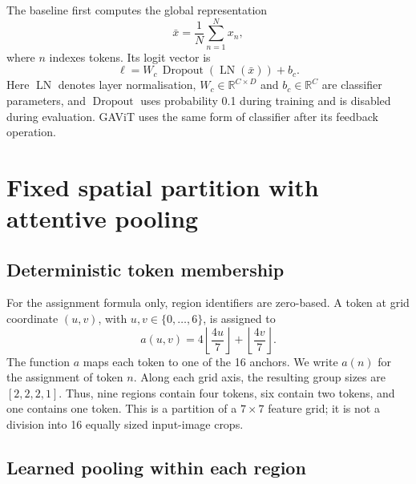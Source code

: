 The baseline first computes the global representation
\begin{equation}
 \bar{x}=\frac{1}{N}\sum_{n=1}^{N}x_n,
 \label{eq:baseline-pooling}
\end{equation}
where $n$ indexes tokens. Its logit vector is
\begin{equation}
 \boldsymbol{\ell}=W_c\,\operatorname{Dropout}
       \!\left(\operatorname{LN}(\bar{x})\right)+b_c.
 \label{eq:classifier}
\end{equation}
Here $\operatorname{LN}$ denotes layer normalisation,
$W_c\in\mathbb{R}^{C\times D}$ and $b_c\in\mathbb{R}^{C}$ are classifier
parameters, and $\operatorname{Dropout}$ uses probability 0.1 during training
and is disabled during evaluation. GAViT uses the same form of classifier
after its feedback operation.

\section{Fixed spatial partition with attentive pooling}

\subsection{Deterministic token membership}

For the assignment formula only, region identifiers are zero-based. A token at
grid coordinate $(u,v)$, with $u,v\in\{0,\ldots,6\}$, is assigned to
\begin{equation}
 a(u,v)=4\left\lfloor\frac{4u}{7}\right\rfloor
          +\left\lfloor\frac{4v}{7}\right\rfloor.
 \label{eq:fixed-assignment}
\end{equation}
The function $a$ maps each token to one of the 16 anchors. We write $a(n)$ for
the assignment of token $n$. Along each grid axis, the resulting group sizes
are $[2,2,2,1]$. Thus, nine regions contain four tokens, six contain two tokens,
and one contains one token. This is a partition of a $7\times7$ feature grid;
it is not a division into 16 equally sized input-image crops.

\subsection{Learned pooling within each region}

